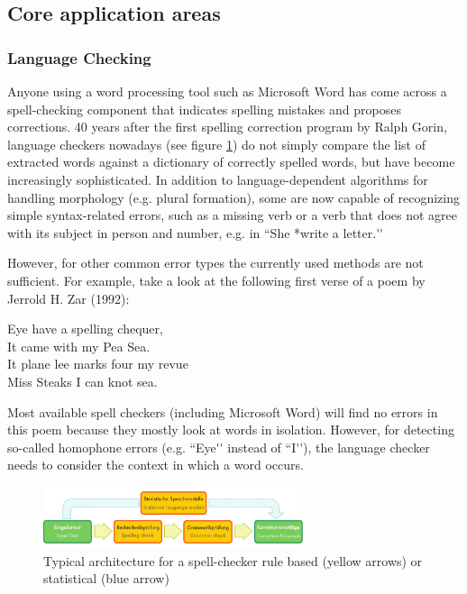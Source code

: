 \begin{multicols}{2}
\subsection{Core application areas}

\subsubsection{Language Checking}
Anyone using a word processing tool such as Microsoft Word has come
across a spell-checking component that indicates spelling mistakes and
proposes corrections. 40 years after the first spelling correction
program by Ralph Gorin, language checkers nowadays (see figure
\ref{fig:spellcheckerEn}) do not simply compare the list of extracted
words against a dictionary of correctly spelled words, but have become
increasingly sophisticated. In addition to language-dependent
algorithms for handling morphology (e.g. plural formation), some are
now capable of recognizing simple syntax-related errors, such as a
missing verb or a verb that does not agree with its subject in person
and number, e.g. in ``She *write a letter.{\mbox '}{\mbox '}

However, for other common error types the currently used methods are
not sufficient. For example, take a look at the following first verse
of a poem by Jerrold H. Zar (1992):
\begin{it}
\begin{center}
Eye have a spelling chequer,\\
It came with my Pea Sea.\\
It plane lee marks four my revue\\
Miss Steaks I can knot sea.\\
\end{center}
\end{it}
Most available spell checkers (including Microsoft Word) will find
no errors in this poem because they mostly look at words in
isolation. However, for detecting so-called homophone errors
(e.g. ``Eye{\mbox '}{\mbox '} instead of ``I{\mbox '}{\mbox '}), the language checker needs to consider
the context in which a word occurs.

\begin{figure}[!ht]
\begin{center}
  \includegraphics[width=3.0in]{../_media/language_checking}
\caption{Typical architecture for a spell-checker rule based (yellow arrows) or statistical (blue arrow)}
\label{fig:spellcheckerEn}
\end{center}
\end{figure}


\end{multicols}
